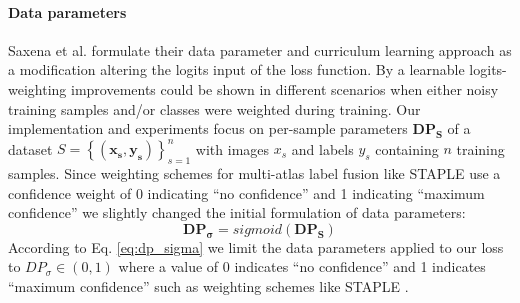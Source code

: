     \paragraph{\textbf{Data parameters}}
        \label{sec:data_parameters}
        Saxena et al. \cite{saxena2019data} formulate their data parameter and curriculum learning approach as a modification altering the logits input of the loss function.
        By a learnable logits-weighting improvements could be shown in different scenarios when either noisy training samples and/or classes were weighted during training.
        Our implementation and experiments focus on per-sample parameters \(\mathbf{DP_{S}}\) of a dataset \(S=\left\{\left(\mathbf{x_s}, \mathbf{y_s}\right)\right\}_{s=1}^{n}\) with images \(x_s\) and labels \(y_s\) containing \(n\) training samples.
        Since weighting schemes for multi-atlas label fusion like STAPLE \cite{warfield2004simultaneous} use a confidence weight of 0 indicating “no confidence” and 1 indicating “maximum confidence” we slightly changed the initial formulation of data parameters:
        \begin{equation}
            \label{eq:dp_sigma}
            \mathbf{DP_{\sigma}} = sigmoid\left(\mathbf{DP_S}\right)
        \end{equation}
        According to Eq. \ref{eq:dp_sigma} we limit the data parameters applied to our loss to \(DP_{\sigma} \in (0,1)\)  where a value of 0 indicates “no confidence” and 1 indicates “maximum confidence” such as weighting schemes like STAPLE \cite{warfield2004simultaneous}.

